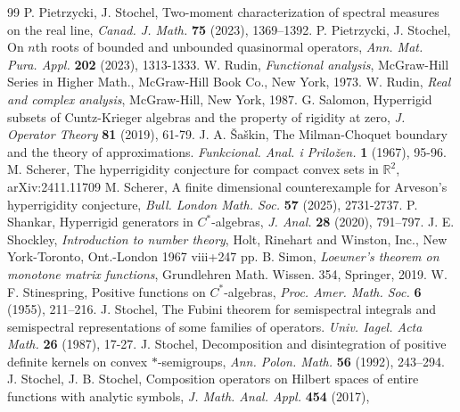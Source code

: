 \documentclass[reqno]{amsproc}
\numberwithin{equation}{section}
\theoremstyle{remark}
\theoremstyle{definition}
\newcommand*{\rbb}{\mathbb{R}}
\begin{document}
\begin{thebibliography}{99}
P. Pietrzycki, J. Stochel, Two-moment characterization
of spectral measures on the real line, {\em Canad. J.
Math.} {\bf 75} (2023), 1369--1392.
P. Pietrzycki, J. Stochel, On $n$th roots of bounded
and unbounded quasinormal operators, {\em Ann. Mat.
Pura. Appl.} {\bf 202} (2023), 1313-1333.
W. Rudin, {\em Functional analysis},
McGraw-Hill Series in Higher Math.,
McGraw-Hill Book Co., New York, 1973.
W. Rudin, {\em Real and complex analysis},
McGraw-Hill, New York, 1987.
    G. Salomon,  Hyperrigid subsets of
Cuntz-Krieger algebras and the property of
rigidity at zero, {\em J. Operator Theory}
{\bf 81} (2019), 61-79.
J. A. \v{S}a\v{s}kin, The Milman-Choquet boundary and
the theory of approximations. {\em Funkcional. Anal. i
Prilo\v{z}en.} {\bf 1} (1967), 95-96.
    M. Scherer, The hyperrigidity
conjecture for compact convex sets in $\rbb^2$,
arXiv:2411.11709
    M. Scherer, A finite dimensional
counterexample for Arveson's hyperrigidity conjecture,
{\em Bull. London Math. Soc.} {\bf 57} (2025),
2731-2737.
    P. Shankar,  Hyperrigid generators
in $C^*$-algebras, {\em J. Anal.} {\bf 28} (2020),
791--797.
    J. E. Shockley, {\em Introduction to number
theory}, Holt, Rinehart and Winston, Inc.,
New York-Toronto, Ont.-London 1967 viii+247
pp.
B. Simon, {\em Loewner's theorem on monotone
matrix functions}, Grundlehren Math. Wissen.
354, Springer, 2019.
W. F. Stinespring, Positive functions on
$C^*$-algebras, {\em Proc. Amer. Math. Soc.} {\bf 6}
(1955), 211--216.
    J. Stochel, The Fubini theorem for
semispectral integrals and semispectral
representations of some families of operators. {\em
Univ. Iagel. Acta Math.} {\bf 26} (1987), 17-27.
J. Stochel, Decomposition and disintegration
of positive definite kernels on convex
$*$-semigroups, {\em Ann. Polon. Math.} {\bf
56} (1992), 243--294.
    J. Stochel, J. B. Stochel,
Composition operators on Hilbert spaces of
entire functions with analytic symbols, {\em
J. Math. Anal. Appl.} {\bf 454} (2017),

\end{thebibliography}
\end{document}

